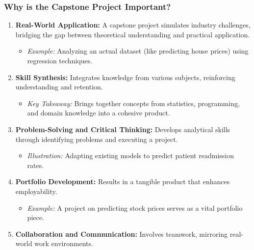 \documentclass[aspectratio=169]{beamer}
\begin{document}
\begin{frame}[fragile]
    \frametitle{Why is the Capstone Project Important?}
    \begin{enumerate}
        \item \textbf{Real-World Application:} 
            A capstone project simulates industry challenges, bridging the gap between theoretical understanding and practical application.
            \begin{itemize}
                \item \textit{Example:} Analyzing an actual dataset (like predicting house prices) using regression techniques.
            \end{itemize}
        
        \item \textbf{Skill Synthesis:} 
            Integrates knowledge from various subjects, reinforcing understanding and retention.
            \begin{itemize}
                \item \textit{Key Takeaway:} Brings together concepts from statistics, programming, and domain knowledge into a cohesive product.
            \end{itemize}

        \item \textbf{Problem-Solving and Critical Thinking:} 
            Develops analytical skills through identifying problems and executing a project.
            \begin{itemize}
                \item \textit{Illustration:} Adapting existing models to predict patient readmission rates.
            \end{itemize}

        \item \textbf{Portfolio Development:} 
            Results in a tangible product that enhances employability.
            \begin{itemize}
                \item \textit{Example:} A project on predicting stock prices serves as a vital portfolio piece.
            \end{itemize}

        \item \textbf{Collaboration and Communication:} 
            Involves teamwork, mirroring real-world work environments.
    \end{enumerate}
\end{frame}
\end{document}
